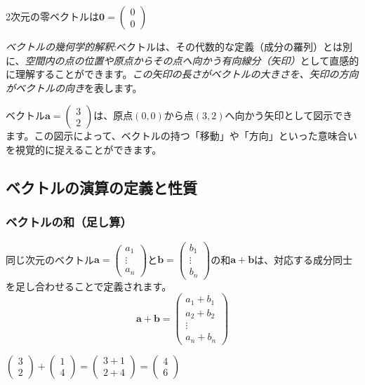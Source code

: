 \begin{ex}
2次元の零ベクトルは$\bm{0} = \begin{pmatrix} 0 \\ 0 \end{pmatrix}$
\end{ex}
\emph{ベクトルの幾何学的解釈}:ベクトルは、その代数的な定義（成分の羅列）とは別に、\emph{空間内の点の位置や原点からその点へ向かう有向線分（矢印）}として直感的に理解することができます。\emph{この矢印の長さがベクトルの大きさを、矢印の方向がベクトルの向き}を表します。
\begin{ex}
ベクトル$\bm{a} = \begin{pmatrix} 3 \\ 2 \end{pmatrix}$は、原点$(0,0)$から点$(3,2)$へ向かう矢印として図示できます。この図示によって、ベクトルの持つ「移動」や「方向」といった意味合いを視覚的に捉えることができます。
\end{ex}

\subsection{ベクトルの演算の定義と性質}
\subsubsection{ベクトルの和（足し算）}
\begin{dfn}[ベクトルの和]
同じ次元のベクトル$\bm{a}=\begin{pmatrix} a_1 \\ \vdots \\ a_n \end{pmatrix}$と$\bm{b}=\begin{pmatrix} b_1 \\ \vdots \\ b_n \end{pmatrix}$の和$\bm{a}+\bm{b}$は、対応する成分同士を足し合わせることで定義されます。
\[\bm{a} + \bm{b} = \begin{pmatrix} a_1 + b_1 \\ a_2 + b_2 \\ \vdots \\ a_n + b_n \end{pmatrix}\]
\end{dfn}
\begin{ex}
$\begin{pmatrix} 3 \\ 2 \end{pmatrix} + \begin{pmatrix} 1 \\ 4 \end{pmatrix} = \begin{pmatrix} 3 + 1 \\ 2 + 4 \end{pmatrix} = \begin{pmatrix} 4 \\ 6 \end{pmatrix}$
\end{ex}


